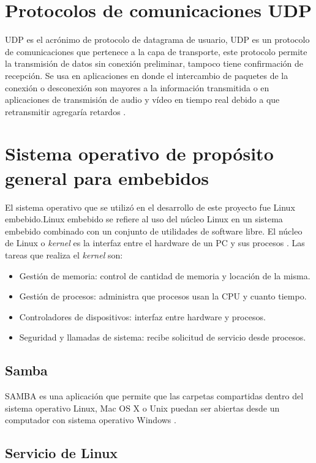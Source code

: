 \section{Protocolos de comunicaciones UDP}
UDP es el acrónimo de protocolo de datagrama de usuario, UDP es un protocolo de comunicaciones que pertenece a la capa de transporte, este protocolo permite la transmisión de datos sin conexión preliminar, tampoco tiene confirmación de recepción. Se usa en aplicaciones en donde el intercambio de paquetes de la conexión o desconexión son mayores a la información transmitida o en aplicaciones de transmisión de audio y vídeo en tiempo real debido a que retransmitir agregaría retardos \citep{WIKIUDP}.


\section{Sistema operativo de propósito general para embebidos}

El sistema operativo que se utilizó en el desarrollo de este proyecto fue Linux embebido.Linux embebido se refiere al uso del núcleo Linux  en un sistema embebido combinado con un conjunto de utilidades de software libre. 
El núcleo de Linux o \textit{kernel} es la interfaz entre el hardware de un PC y sus procesos \citep{KERNEL}. Las tareas que realiza el \textit{kernel} son:

\begin{itemize}
\item Gestión de memoria: control de cantidad de memoria y locación de la misma.
\item Gestión de procesos: administra que procesos usan la CPU y cuanto tiempo.
\item Controladores de dispositivos: interfaz entre hardware y procesos.
\item Seguridad y llamadas de sistema: recibe solicitud de servicio desde procesos. 
\end{itemize}


\subsection{Samba}
SAMBA es una aplicación que permite que las carpetas compartidas dentro del sistema operativo Linux, Mac OS X o Unix  puedan ser abiertas desde un computador con sistema operativo Windows \citep{WIKISAMBA}.

\subsection{Servicio de Linux}

